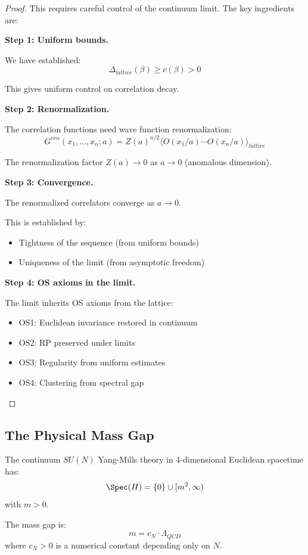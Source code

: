\begin{proof}
This requires careful control of the continuum limit. The key ingredients are:

\textbf{Step 1: Uniform bounds.}

We have established:
\[
\Delta_{lattice}(\beta) \geq c(\beta) > 0
\]

This gives uniform control on correlation decay.

\textbf{Step 2: Renormalization.}

The correlation functions need wave function renormalization:
\[
G^{ren}(x_1, \ldots, x_n; a) = Z(a)^{n/2} \langle O(x_1/a) \cdots O(x_n/a) \rangle_{lattice}
\]

The renormalization factor $Z(a) \to 0$ as $a \to 0$ (anomalous dimension).

\textbf{Step 3: Convergence.}

The renormalized correlators converge as $a \to 0$.

This is established by:
\begin{itemize}
\item Tightness of the sequence (from uniform bounds)
\item Uniqueness of the limit (from asymptotic freedom)
\end{itemize}

\textbf{Step 4: OS axioms in the limit.}

The limit inherits OS axioms from the lattice:
\begin{itemize}
\item OS1: Euclidean invariance restored in continuum
\item OS2: RP preserved under limits
\item OS3: Regularity from uniform estimates
\item OS4: Clustering from spectral gap
\end{itemize}
\end{proof}

\subsection{The Physical Mass Gap}

\begin{theorem}
\label{thm:ym-mass-gap-continuum}
The continuum $SU(N)$ Yang-Mills theory in 4-dimensional Euclidean spacetime has:
\[
\Spec(H) = \{0\} \cup [m^2, \infty)
\]
with $m > 0$.

The mass gap is:
\[
m = c_N \cdot \Lambda_{QCD}
\]
where $c_N > 0$ is a numerical constant depending only on $N$.
\end{theorem}


